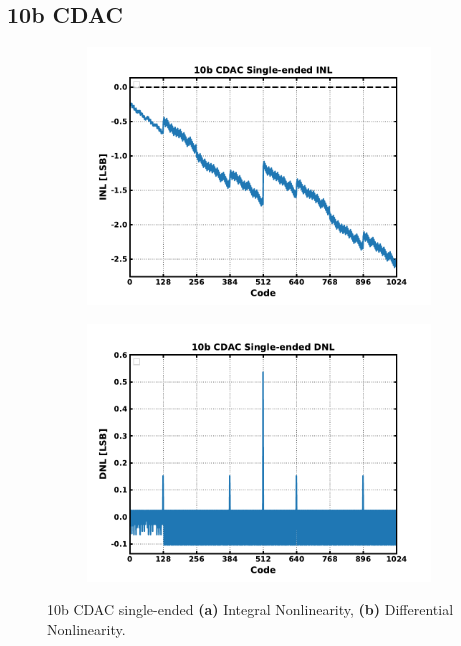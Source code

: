 \subsection{10b CDAC}

	\begin{figure}[htb!]
	    \centering
	    \begin{subfigure}{0.5\textwidth}
	        \centering
	        \includegraphics[width=1\textwidth, angle=0]{./figs/results/10b_cdac_se_inl}
	        \caption{ }
	        \label{fig:10b_cdac_se_inl}
	    \end{subfigure}%
	    \begin{subfigure}{0.5\textwidth}
	        \centering
	        \includegraphics[width=1\textwidth, angle=0]{./figs/results/10b_cdac_se_dnl}
	        \caption{ }
	        \label{fig:10b_cdac_se_dnl}
	    \end{subfigure}
	    \label{fig:10b_cdac_se_nonlinearity}
	    \caption{10b CDAC single-ended \textbf{(a)} Integral Nonlinearity, \textbf{(b)} Differential Nonlinearity.}
	\end{figure} 



